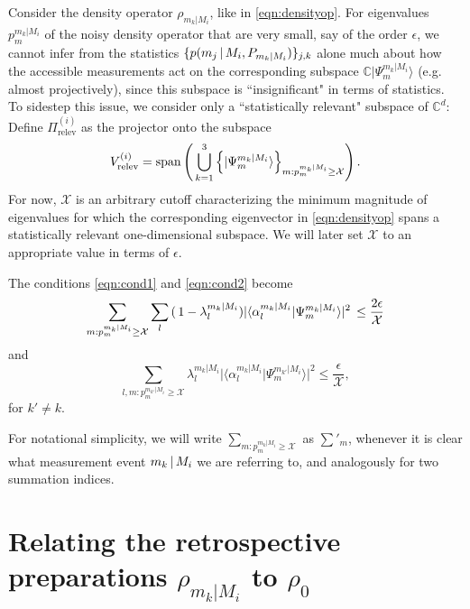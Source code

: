 Consider the density operator $\rho_{m_k\vert M_i}$, like in \ref{eqn:densityop}. For eigenvalues $p_m^{m_k\vert M_i}$ of the noisy density operator that are very small, say of the order $\epsilon$, we cannot infer from the statistics $\{p(m_j\thinspace\vert\thinspace M_i, P_{m_k\vert M_i})\}_{j,k}$ alone much about how the accessible measurements act on the corresponding subspace $\mathbb{C}\vert \Psi_m^{m_k\vert M_i}\rangle$ (e.g. almost projectively), since this subspace is ``insignificant" in terms of statistics. To sidestep this issue, we consider only a ``statistically relevant" subspace of $\mathbb{C}^d$:
Define $\Pi_{\text{relev}}^{(i)}$ as the projector onto the subspace 
\begin{equation}
\label{eqn:relevsubspace}
V_{\text{relev}}^{(i)}=\operatorname{span}\left(\thinspace\bigcup_{k=1}^3\left\{\vert \Psi_m^{m_k\vert M_i}\rangle\right\}_{m:p_m^{m_k\vert M_i}\geq\mathcal{X}}\right).
\end{equation}
For now, $\mathcal{X}$ is an arbitrary cutoff characterizing the minimum magnitude of eigenvalues for which the corresponding eigenvector in \ref{eqn:densityop} spans a statistically relevant one-dimensional subspace. We will later set $\mathcal{X}$ to an appropriate value in terms of $\epsilon$. 

The conditions \ref{eqn:cond1} and \ref{eqn:cond2} become
\begin{equation}
\label{eqn:cond1new}
\sum_{m:p_m^{m_k\vert M_i}\geq \mathcal{X}} \sum_l \,(\thinspace 1- \lambda_l^{m_k\vert M_i}) \vert \langle \alpha_l^{m_k\vert M_i}\vert \Psi_m^{m_k\vert M_i} \rangle \vert^2\thinspace \leq \frac{2\epsilon}{\mathcal{X}}
\end{equation}
and
\begin{equation}
\label{eqn:cond2new}
\sum_{l,m:p_m^{m_{k'}\vert M_i}\geq \mathcal{X}} \lambda_l^{m_k\vert M_i} \vert \langle \alpha_l^{m_k\vert M_i}\vert \Psi_m^{m_{k'}\vert M_i} \rangle \vert^2\leq \frac{\epsilon}{\mathcal{X}},
\end{equation}
for $k'\neq k$.

For notational simplicity, we will write $\sum_{m:p_m^{m_k\vert M_i}\geq \mathcal{X}}$ as $\sum'_m$, whenever it is clear what measurement event $m_k\thinspace\vert\thinspace M_i$ we are referring to, and analogously for two summation indices.

\section{Relating the retrospective preparations $\rho_{m_k \vert M_i}$ to $\rho_0$}

